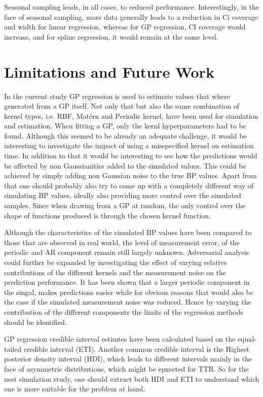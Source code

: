Seasonal sampling leads, in all cases, to reduced performance.
Interestingly, in the face of seasonal sampling, more data generally leads to
a reduction in Ci coverage and width for linear regression,
whereas for GP regression, CI coverage would increase,
and for spline regression, it would remain at the same level.



\section{Limitations and Future Work}

In the current study GP regression is used to estimate values that
where generated from a GP itself. Not only that but also the same
combination of kernel types, i.e. RBF, Matérn and Periodic kernel,
have been used for simulation and estimation.
When fitting a GP, only the kernl hyperparameters had to be found.
Although this seemed to be already an adequate challenge, it
would be interesting to investigate the impact of using a misspecified
kernel on estimation time.
In addition to that it would be interesting to see how the predictions
would be affected by non Gaussianities added to the simulated values.
This could be achieved by simply adding non Gaussian noise to the
true BP values.
Apart from that one should probably also try to come up with
a completely different way of simulating BP values, ideally also
providing more control over the simulated samples. Since when drawing from
a GP at random, the only control over the shape of functions produced is
through the chosen kernel function.

Although the characteristics of the simulated BP values have been compared
to those that are observed in real world, the level of measurement error,
of the periodic and AR component remain still largely
unknown. Adversarial analysis could further be expanded by investigating
the effect of varying relative contributions of the different kernels and the measurement noise
on the prediction performance.
It has been shown that a larger periodic component in the singal,
makes predictions easier while for obvious reasons that would also be the case
if the simulated measurement noise was reduced. Hence by varying the contribution
of the different components the limits of the regression methods should be
identified.

GP regression credible interval estimtes have been calculated based on the
equal-tailed credible interval (ETI). Another common credible interval is the
Highest posterior density interval (HDI), which leads to different intervals
mainly in the face of asymmetric distributions, which might be epxected
for TTR. So for the nest simulation study, one should extract both HDI and ETI
to understand which one is more suitable for the problem at hand.



